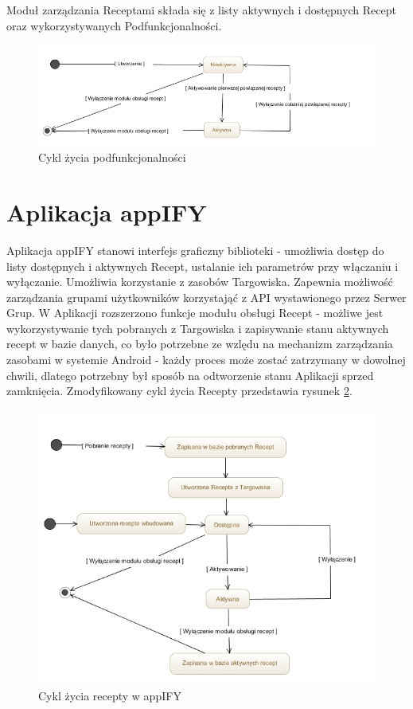 \documentclass[11pt,a4paper,polish,thesis]{dcsbook}
\begin{document}
Moduł zarządzania Receptami składa się z listy aktywnych i dostępnych Recept oraz wykorzystywanych Podfunkcjonalności.
\begin{figure}[H]
  \centering
  \includegraphics[scale=0.6]{./resources/cykl-zycia-featurea.jpg}
  \caption{Cykl życia podfunkcjonalności}
  \label{fig:cykl-zycia-featurea}
\end{figure}

\section{Aplikacja appIFY}
Aplikacja appIFY stanowi interfejs graficzny biblioteki - umożliwia dostęp do listy dostępnych i aktywnych Recept, ustalanie ich parametrów przy włączaniu i wyłączanie. Umożliwia korzystanie z zasobów Targowiska. Zapewnia możliwość zarządzania grupami użytkowników korzystająć z API wystawionego przez Serwer Grup.
W Aplikacji rozszerzono funkcje modułu obsługi Recept - możliwe jest wykorzystywanie tych pobranych z Targowiska i zapisywanie stanu aktywnych recept w bazie danych, co było potrzebne ze wzlędu na mechanizm zarządzania zasobami w systemie Android - każdy proces może zostać zatrzymany w dowolnej chwili, dlatego potrzebny był sposób na odtworzenie stanu Aplikacji sprzed zamknięcia. Zmodyfikowany cykl życia Recepty przedstawia rysunek \ref{fig:cykl-zycia-recepty-appify}.
\begin{figure}[H]
  \centering
  \includegraphics[scale=0.7]{./resources/cykl-zycia-recepty-appify.jpg}
  \caption{Cykl życia recepty w appIFY}
  \label{fig:cykl-zycia-recepty-appify}
\end{figure}
\end{document}
